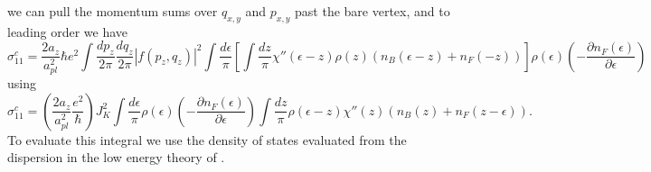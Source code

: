 \documentclass[aps,prl,twocolumn,superscriptaddress,amsmath,nofootinbib,10pt,floatfix]{revtex4-2}
\begin{document}
\begin{widetext}
we can pull the momentum sums over $q_{x,y}$ and $p_{x,y}$ past
the bare vertex, and to leading order we have 
\begin{equation}
\sigma_{11}^{c}=\frac{2a_{z}}{a_{pl}^{2}}\hbar e^{2}\int\frac{dp_{z}}{2\pi}\frac{dq_{z}}{2\pi}\left|f\left(p_{z},q_{z}\right)\right|^{2}\int\frac{d\epsilon}{\pi}\left[\int\frac{dz}{\pi}\chi''\left(\epsilon-z\right)\rho\left(z\right)\left(n_{B}\left(\epsilon-z\right)+n_{F}\left(-z\right)\right)\right]\rho\left(\epsilon\right)\left(-\frac{\partial n_{F}\left(\epsilon\right)}{\partial\epsilon}\right)
\end{equation}
using 
\[
\sigma_{11}^{c}=\left(\frac{2a_{z}}{a_{pl}^{2}}\frac{e^{2}}{\hbar}\right)J_{K}^{2}\int\frac{d\epsilon}{\pi}\rho\left(\epsilon\right)\left(-\frac{\partial n_{F}\left(\epsilon\right)}{\partial\epsilon}\right)\int\frac{dz}{\pi}\rho\left(\epsilon-z\right)\chi''\left(z\right)\left(n_{B}\left(z\right)+n_{F}\left(z-\epsilon\right)\right).
\]
To evaluate this integral we use the density of states evaluated from
the dispersion in the low energy theory of \cite{sunko_probing_2020}.


\end{widetext}
\end{document}
